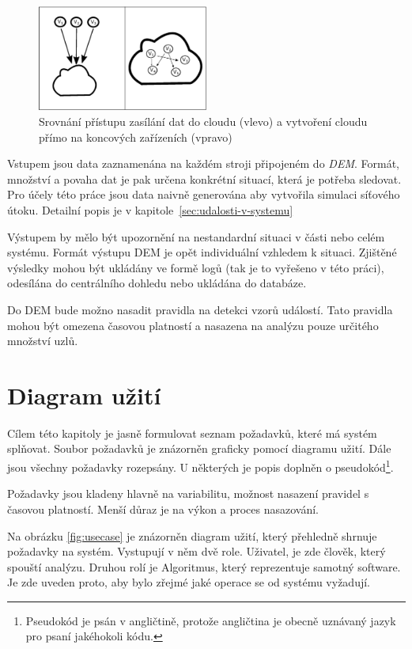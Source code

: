 \documentclass[
  digital, %
  table,   %
  nolof,     %
  nolot,     %
  oneside, %
  nocover,
  monochrome,
  12pt
]{fithesis3}
\begin{document}
\begin{figure}[H]
	\centering
    \includegraphics[width=0.5\textwidth, height=0.20\textheight]{images/cloud-comparison.eps}
    \caption{Srovnání přístupu zasílání dat do cloudu (vlevo) a vytvoření cloudu přímo na koncových zařízeních (vpravo)}
    \label{fig:cloud-comparison}
\end{figure}

Vstupem jsou data zaznamenána na každém stroji připojeném do \textit{DEM}. Formát, množství a povaha dat je pak určena konkrétní situací, která je potřeba sledovat. Pro účely této práce jsou data naivně generována aby vytvořila simulaci síťového útoku. Detailní popis je v kapitole~\ref{sec:udalosti-v-systemu}

Výstupem by mělo být upozornění na nestandardní situaci v části nebo celém systému. Formát výstupu DEM je opět individuální vzhledem k situaci. Zjištěné výsledky mohou být ukládány ve formě logů (tak je to vyřešeno v této práci), odesílána do centrálního dohledu nebo ukládána do databáze.

Do DEM bude možno nasadit pravidla na detekci vzorů událostí. Tato pravidla mohou být omezena časovou platností a nasazena na analýzu pouze určitého množství uzlů.

\section{Diagram užití}
Cílem této kapitoly je jasně formulovat seznam požadavků, které má systém splňovat. Soubor požadavků je znázorněn graficky pomocí diagramu užití. Dále jsou všechny požadavky rozepsány. U některých je popis doplněn o pseudokód\footnote{Pseudokód je psán v angličtině, protože angličtina je obecně uznávaný jazyk pro psaní jakéhokoli kódu.}.

Požadavky jsou kladeny hlavně na variabilitu, možnost nasazení pravidel s časovou platností. Menší důraz je na výkon a proces nasazování.

Na obrázku \ref{fig:usecase} je znázorněn diagram užití, který přehledně shrnuje požadavky na systém. Vystupují v něm dvě role. Uživatel, je zde člověk, který spouští analýzu. Druhou rolí je Algoritmus, který reprezentuje samotný software. Je zde uveden proto, aby bylo zřejmé jaké operace se od systému vyžadují.
\end{document}
